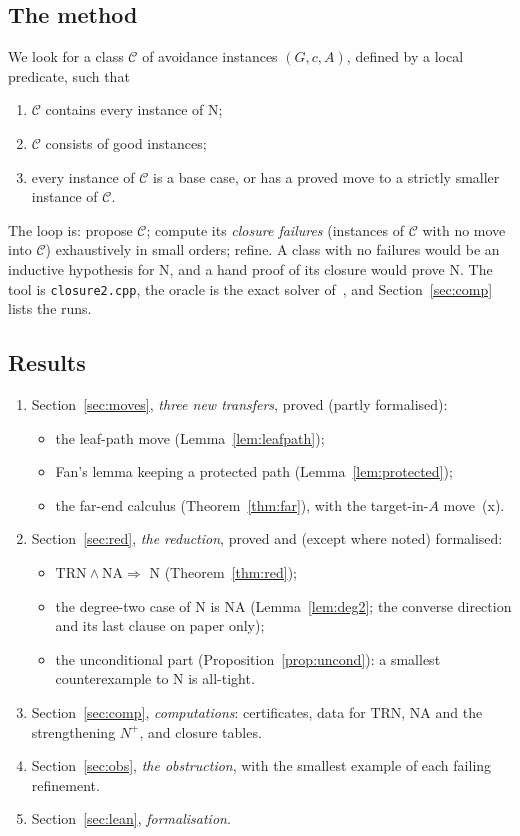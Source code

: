 \documentclass[11pt]{amsart}
\theoremstyle{definition}
\newcommand{\cC}{\mathcal C}
\newcommand{\TRN}{\mathrm{TRN}}
\newcommand{\NA}{\mathrm{NA}}
\begin{document}
\subsection*{The method}
We look for a class $\cC$ of avoidance instances $(G,c,A)$, defined by a local predicate, such that
\begin{enumerate}
\item $\cC$ contains every instance of N;
\item $\cC$ consists of good instances;
\item every instance of $\cC$ is a base case, or has a proved move to a strictly smaller instance of
$\cC$.
\end{enumerate}
The loop is: propose $\cC$; compute its \emph{closure failures} (instances of $\cC$ with no move
into $\cC$) exhaustively in small orders; refine. A class with no failures would be an inductive
hypothesis for N, and a hand proof of its closure would prove N. The tool is
\texttt{closure2.cpp}, the oracle is the exact solver of~\cite{L1I}, and Section~\ref{sec:comp}
lists the runs.

\subsection*{Results}
\begin{enumerate}
\item Section~\ref{sec:moves}, \emph{three new transfers}, proved (partly formalised):
  \begin{itemize}
  \item the leaf-path move (Lemma~\ref{lem:leafpath});
  \item Fan's lemma keeping a protected path (Lemma~\ref{lem:protected});
  \item the far-end calculus (Theorem~\ref{thm:far}), with the target-in-$A$ move~(x).
  \end{itemize}
\item Section~\ref{sec:red}, \emph{the reduction}, proved and (except where noted) formalised:
  \begin{itemize}
  \item $\TRN\wedge\NA\Rightarrow$ N (Theorem~\ref{thm:red});
  \item the degree-two case of N is NA (Lemma~\ref{lem:deg2}; the converse direction and its last
  clause on paper only);
  \item the unconditional part (Proposition~\ref{prop:uncond}): a smallest counterexample to N is
  all-tight.
  \end{itemize}
\item Section~\ref{sec:comp}, \emph{computations}: certificates, data for $\TRN$, NA and the
strengthening $N^+$, and closure tables.
\item Section~\ref{sec:obs}, \emph{the obstruction}, with the smallest example of each failing
refinement.
\item Section~\ref{sec:lean}, \emph{formalisation}.
\end{enumerate}
\end{document}
